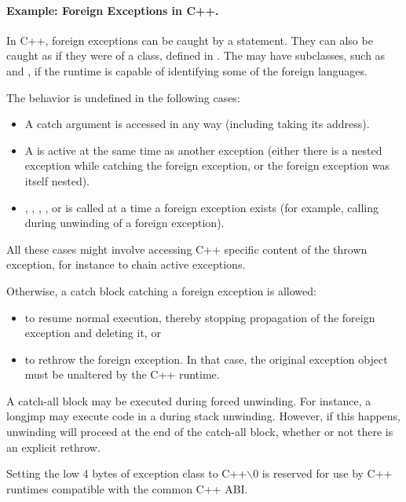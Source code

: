 \paragraph{Example: Foreign Exceptions in C++.} In C++, foreign exceptions can be
caught by a  statement. They can also be caught as if they
were of a  class, defined in . The
 may have subclasses, such as
 and , if the runtime is capable
of identifying some of the foreign languages.

The behavior is undefined in the following cases:
\begin{itemize}
\item A  catch argument is accessed in any way
     (including taking its address).

\item A  is active at the same time as another
     exception (either there is a nested exception while catching the
     foreign exception, or the foreign exception was itself nested).

\item {}, ,
     , , or
      is called at a time a foreign exception
     exists (for example, calling  during
     unwinding of a foreign exception).
\end{itemize}

All these cases might involve accessing C++ specific content of the
thrown exception, for instance to chain active exceptions.

Otherwise, a catch block catching a foreign exception is allowed:
\begin{itemize}
\item to resume normal execution, thereby stopping propagation of
      the foreign exception and deleting it, or
\item to rethrow the foreign exception. In that case, the original
      exception object must be unaltered by the C++ runtime.
\end{itemize}

A catch-all block may be executed during forced unwinding.  For
instance, a longjmp may execute code in a  during
stack unwinding. However, if this happens, unwinding will proceed at
the end of the catch-all block, whether or not there is an explicit
rethrow.

Setting the low 4 bytes of exception class to C++$\backslash$0 is reserved
for use by C++ runtimes compatible with the common C++ ABI.

